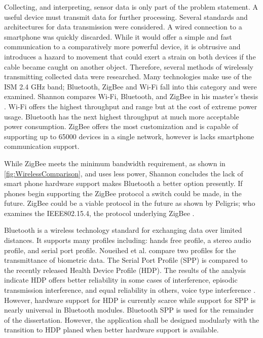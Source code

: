 Collecting, and interpreting, sensor data is only part of the problem statement. A useful device must transmit data for further processing. Several standards and architectures for data transmission were considered. A wired connection to a smartphone was quickly discarded. While it would offer a simple and fast communication to a comparatively more powerful device, it is obtrusive and introduces a hazard to movement that could exert a strain on both devices if the cable became caught on another object. Therefore, several methods of wirelessly transmitting collected data were researched. Many technologies make use of the ISM 2.4 GHz band; Bluetooth, ZigBee and Wi-Fi fall into this category and were examined.  Shannon compares Wi-Fi, Bluetooth, and ZigBee in his master's thesis \cite{Shannon2012}. Wi-Fi offers the highest throughput and range but at the cost of extreme power usage. Bluetooth has the next highest throughput at much more acceptable power consumption. ZigBee offers the most customization and is capable of supporting up to 65000 devices in a single network, however is lacks smartphone communication support.

While ZigBee meets the minimum bandwidth requirement, as shown in \cref{fig:WirelessComparison}, and uses less power, Shannon concludes the lack of smart phone hardware support makes Bluetooth a better option presently. If phones begin supporting the ZigBee protocol a switch could be made, in the future.  ZigBee could be a viable protocol in the future as shown by Peligris; who examines the IEEE802.15.4\cite{IEEE802.15.42011}, the protocol underlying ZigBee \cite{Pelegris2011}.

Bluetooth is a wireless technology standard for exchanging data over limited distances. It supports many profiles including: hands free profile, a stereo audio profile, and serial port profile. Noueihed et al. compare two profiles for the transmittance of biometric data. The Serial Port Profile (SPP) is compared to the recently released Health Device Profile (HDP). The results of the analysis indicate HDP offers better reliability in some cases of interference, episodic transmission interference, and equal reliability in others, voice type interference \cite{Noueihed2010}. However, hardware support for HDP is currently scarce while support for SPP is nearly universal in Bluetooth modules. Bluetooth SPP is used for the remainder of the dissertation. However, the application shall be designed modularly with the transition to HDP planed when better hardware support is available.

